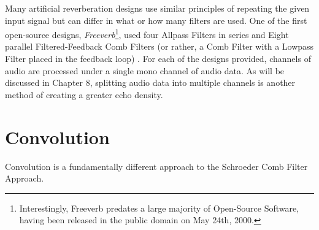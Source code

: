 Many artificial reverberation designs use similar principles of repeating the given input signal but can differ in what or how many filters are used. One of the first open-source designs, \textit{Freeverb}\footnote{Interestingly, Freeverb predates a large majority of Open-Source Software, having been released in the public domain on May 24th, 2000.}, used four Allpass Filters in series and Eight parallel Filtered-Feedback Comb Filters (or rather, a Comb Filter with a Lowpass Filter placed in the feedback loop) \cite{PASPWEB2010}. For each of the designs provided, channels of audio are processed under a single mono channel of audio data. As will be discussed in Chapter 8, splitting audio data into multiple channels is another method of creating a greater echo density.

\section{Convolution}
Convolution is a fundamentally different approach to the Schroeder Comb Filter Approach.
